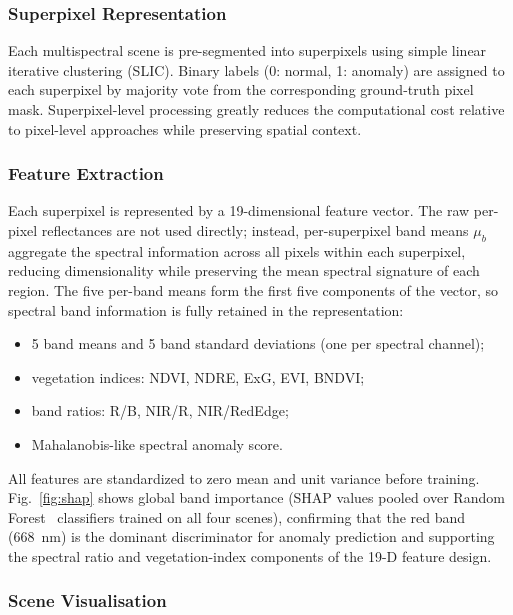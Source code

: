 \documentclass[lettersize,journal]{IEEEtran}
\begin{document}
\subsubsection{Superpixel Representation}

Each multispectral scene is pre-segmented into superpixels using
simple linear iterative clustering (SLIC). Binary labels (0: normal,
1: anomaly) are assigned to each superpixel by majority vote from the
corresponding ground-truth pixel mask. Superpixel-level processing
greatly reduces the computational cost relative to pixel-level
approaches while preserving spatial context.

\subsubsection{Feature Extraction}
\label{sec:feature-extraction}

Each superpixel is represented by a 19-dimensional feature vector.
The raw per-pixel reflectances are not used directly; instead,
per-superpixel band means $\mu_b$ aggregate the spectral information
across all pixels within each superpixel, reducing dimensionality
while preserving the mean spectral signature of each region.
The five per-band means form the first five components of the vector,
so spectral band information is fully retained in the representation:
\begin{itemize}
    \item 5 band means and 5 band standard deviations (one per
          spectral channel);
    \item vegetation indices: NDVI, NDRE, ExG, EVI, BNDVI;
    \item band ratios: R/B, NIR/R, NIR/RedEdge;
    \item Mahalanobis-like spectral anomaly score.
\end{itemize}

\noindent All features are standardized to zero mean and unit variance
before training. Fig.~\ref{fig:shap} shows global band importance
(SHAP values pooled over Random Forest~\cite{breiman2001random}
classifiers trained on all four scenes), confirming that the red band (668~nm) is the dominant
discriminator for anomaly prediction and supporting the spectral ratio
and vegetation-index components of the 19-D feature design.

\subsubsection{Scene Visualisation}
\end{document}

